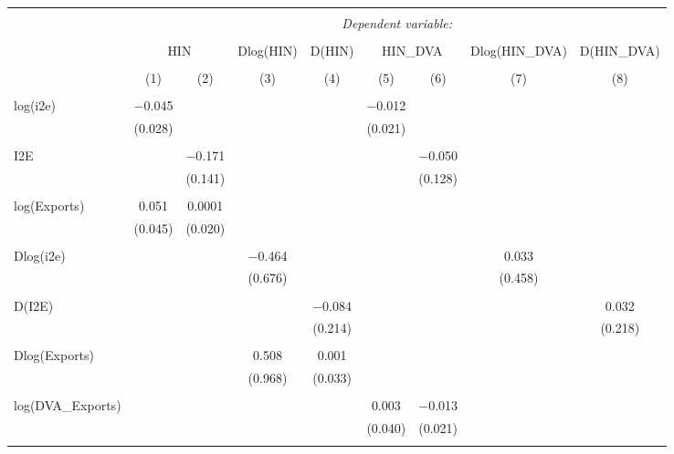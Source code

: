 
\begin{table}[!htbp] \centering 
  \caption{} 
  \label{} 
\begin{tabular}{@{\extracolsep{5pt}}lcccccccc} 
\\[-1.8ex]\hline 
\hline \\[-1.8ex] 
 & \multicolumn{8}{c}{\textit{Dependent variable:}} \\ 
\cline{2-9} 
\\[-1.8ex] & \multicolumn{2}{c}{HIN} & Dlog(HIN) & D(HIN) & \multicolumn{2}{c}{HIN\_DVA} & Dlog(HIN\_DVA) & D(HIN\_DVA) \\ 
\\[-1.8ex] & (1) & (2) & (3) & (4) & (5) & (6) & (7) & (8)\\ 
\hline \\[-1.8ex] 
 log(i2e) & $-$0.045 &  &  &  & $-$0.012 &  &  &  \\ 
  & (0.028) &  &  &  & (0.021) &  &  &  \\ 
  & & & & & & & & \\ 
 I2E &  & $-$0.171 &  &  &  & $-$0.050 &  &  \\ 
  &  & (0.141) &  &  &  & (0.128) &  &  \\ 
  & & & & & & & & \\ 
 log(Exports) & 0.051 & 0.0001 &  &  &  &  &  &  \\ 
  & (0.045) & (0.020) &  &  &  &  &  &  \\ 
  & & & & & & & & \\ 
 Dlog(i2e) &  &  & $-$0.464 &  &  &  & 0.033 &  \\ 
  &  &  & (0.676) &  &  &  & (0.458) &  \\ 
  & & & & & & & & \\ 
 D(I2E) &  &  &  & $-$0.084 &  &  &  & 0.032 \\ 
  &  &  &  & (0.214) &  &  &  & (0.218) \\ 
  & & & & & & & & \\ 
 Dlog(Exports) &  &  & 0.508 & 0.001 &  &  &  &  \\ 
  &  &  & (0.968) & (0.033) &  &  &  &  \\ 
  & & & & & & & & \\ 
 log(DVA\_Exports) &  &  &  &  & 0.003 & $-$0.013 &  &  \\ 
  &  &  &  &  & (0.040) & (0.021) &  &  \\ 
  & & & & & & & & \\ 

\end{tabular}
\end{table}
